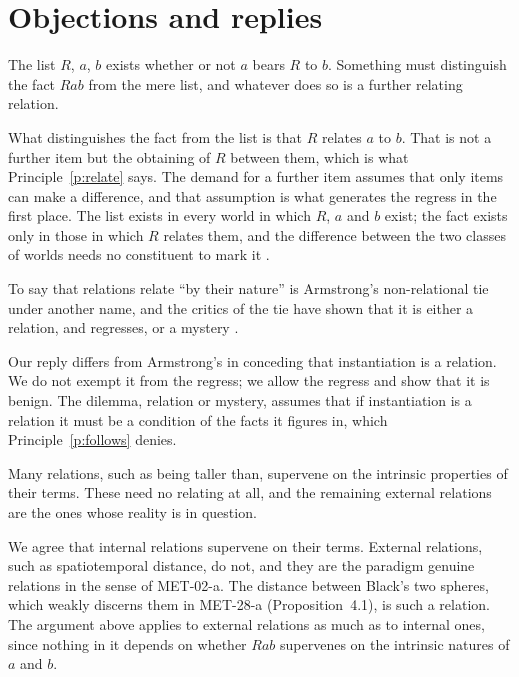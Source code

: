 \documentclass{situationist-preprint}
\begin{document}
\section{Objections and replies}

\begin{objection}
The list $R$, $a$, $b$ exists whether or not $a$ bears $R$ to $b$. Something must distinguish the fact $Rab$ from the mere list, and whatever does so is a further relating relation.
\end{objection}

\begin{reply}
What distinguishes the fact from the list is that $R$ relates $a$ to $b$. That is not a further item but the obtaining of $R$ between them, which is what Principle~\ref{p:relate} says. The demand for a further item assumes that only items can make a difference, and that assumption is what generates the regress in the first place. The list exists in every world in which $R$, $a$ and $b$ exist; the fact exists only in those in which $R$ relates them, and the difference between the two classes of worlds needs no constituent to mark it \citep{Gaskin2008}.
\end{reply}

\begin{objection}[Relabelling]
To say that relations relate \enquote{by their nature} is Armstrong's non-relational tie under another name, and the critics of the tie have shown that it is either a relation, and regresses, or a mystery \citep{Maurin2012}.
\end{objection}

\begin{reply}
Our reply differs from Armstrong's in conceding that instantiation is a relation. We do not exempt it from the regress; we allow the regress and show that it is benign. The dilemma, relation or mystery, assumes that if instantiation is a relation it must be a condition of the facts it figures in, which Principle~\ref{p:follows} denies.
\end{reply}

\begin{objection}
Many relations, such as being taller than, supervene on the intrinsic properties of their terms. These need no relating at all, and the remaining external relations are the ones whose reality is in question.
\end{objection}

\begin{reply}
We agree that internal relations supervene on their terms. External relations, such as spatiotemporal distance, do not, and they are the paradigm genuine relations in the sense of MET-02-a. The distance between Black's two spheres, which weakly discerns them in MET-28-a (Proposition~4.1), is such a relation. The argument above applies to external relations as much as to internal ones, since nothing in it depends on whether $Rab$ supervenes on the intrinsic natures of $a$ and $b$.
\end{reply}
\end{document}
